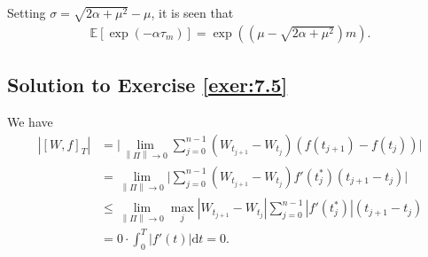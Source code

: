 \documentclass[12pt]{book}
\numberwithin{equation}{chapter}
\theoremstyle{plain}
\numberwithin{theorem}{section}
\theoremstyle{definition}
\numberwithin{exercise}{chapter}
\newcommand{\<}{\langle}
\renewcommand{\>}{\rangle}
\renewcommand{\(}{\left(}
\renewcommand{\)}{\right)}
\renewcommand{\[}{\left[}
\renewcommand{\]}{\right]}
\newcommand\Eb{\mathds{E}}
\newcommand\Fc{\mathscr{F}}
\newcommand\dd{\mathrm{d}}
\newcommand{\norm}[1]{\left\|#1\right\|}
\begin{document}
Setting $\sigma = \sqrt{2 \alpha +\mu ^2}-\mu$, it is seen that
\begin{align}
\Eb[ \exp( - \alpha \tau_m)]
	= \exp\( \(\mu - \sqrt{2 \alpha + \mu^2} \)m\).
\end{align}

\subsection*{Solution to Exercise \ref{exer:7.5}}
We have
\begin{align}
| [W,f]_T |
	&=	\Big| \lim_{\norm{\Pi} \to 0} \sum_{j=0}^{n-1} (W_{t_{j+1}} - W_{t_j} ) (f(t_{j+1}) - f(t_j) ) \Big| \\
	&=	\lim_{\norm{\Pi} \to 0} \Big|  \sum_{j=0}^{n-1} (W_{t_{j+1}} - W_{t_j} ) f'(t_j^*) (t_{j+1} - t_j ) \Big| \\
	&\leq \lim_{\norm{\Pi} \to 0} \max_j |W_{t_{j+1}} - W_{t_j}| \sum_{j=0}^{n-1} |f'(t_j^*) | (t_{j+1} - t_j ) \\
	&=	0 \cdot \int_0^T |f'(t)| \dd t
	=	0 .
\end{align}
\end{document}
